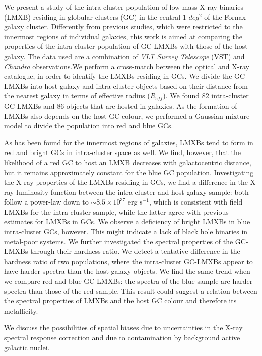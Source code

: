 \documentclass{aa}
\begin{document}
  \abstract
  {} 
   {We present a study of the intra-cluster population of low-mass X-ray binaries (LMXB) residing in globular clusters (GC) in the central 1 $deg^2$ of the Fornax galaxy cluster. 
   Differently from previous studies, which were restricted to the innermost regions of individual galaxies, this work is aimed at comparing the properties of the intra-cluster population of GC-LMXBs with those of  the host galaxy. }
   {The data used are a combination of \textit{VLT Survey Telescope} (VST) and \textit{Chandra} observations.We perform a cross-match between the optical and X-ray catalogue, in order to identify the LMXBs residing in GCs. We divide the GC-LMXBs into host-galaxy and intra-cluster objects based on their distance from the nearest galaxy in terms of effective radius ($R_{eff}$). We found  82  intra-cluster  GC-LMXBs  and  86  objects that are hosted in galaxies. As the formation of LMXBs also depends on the host GC colour, we performed a Gaussian mixture model to divide the population into red and blue GCs.  }
   {As has been found for the innermost regions of galaxies, LMXBs tend to form in red and bright GCs in intra-cluster space as well. We find, however, that the likelihood of a red GC to host an LMXB decreases with galactocentric distance, but it remains approximately constant for the blue GC population. Investigating the X-ray properties of the LMXBs residing in GCs, we find a difference in the X-ray luminosity function between the intra-cluster and host-galaxy sample: both follow a power-law down to $\sim 8.5\times 10^{37}$ erg s$^{-1}$, which is consistent with field LMXBs for the intra-cluster sample, while the latter agree with previous estimates for LMXBs in GCs. We observe a deficiency of bright LMXBs in blue intra-cluster GCs, however. This might indicate a lack of black hole binaries in metal-poor systems. We further investigated the spectral properties of the GC-LMXBs through their hardness-ratio. We detect a tentative difference in the hardness ratio of two populations, where the intra-cluster GC-LMXBs appear to have harder spectra than the host-galaxy objects. We find the same trend when we compare red and blue GC-LMXBs: the spectra of the blue sample are harder spectra than those of the red sample. This result could suggest a relation between the spectral properties of LMXBs and the host GC colour and therefore its metallicity. 
   
   We discuss the possibilities of spatial biases due to uncertainties in the X-ray spectral response correction and due to contamination by background active galactic nuclei.} %
   
\end{document}
